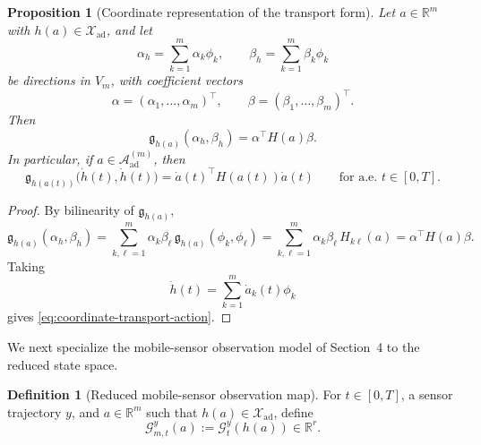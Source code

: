 \documentclass{article}
\newtheorem{proposition}[theorem]{Proposition}
\theoremstyle{definition}
\newtheorem{definition}[theorem]{Definition}
\begin{document}
\begin{proposition}[Coordinate representation of the transport form]
    \label{prop:coordinate-transport-form}
    Let \(a\in\mathbb R^m\) with \(h(a)\in \mathcal X_{\mathrm{ad}}\), and let
    \[
        \alpha_h=\sum_{k=1}^m \alpha_k\phi_k,
        \qquad
        \beta_h=\sum_{k=1}^m \beta_k\phi_k
    \]
    be directions in \(V_m\), with coefficient vectors
    \[
        \alpha=(\alpha_1,\dots,\alpha_m)^\top,
        \qquad
        \beta=(\beta_1,\dots,\beta_m)^\top.
    \]
    Then
    \begin{equation}
        \label{eq:coordinate-transport-form}
        \mathfrak g_{h(a)}(\alpha_h,\beta_h)=\alpha^\top H(a)\beta.
    \end{equation}
    In particular, if \(a\in \mathcal A_{\mathrm{ad}}^{(m)}\), then
    \begin{equation}
        \label{eq:coordinate-transport-action}
        \mathfrak g_{h(a(t))}\bigl(\dot h(t),\dot h(t)\bigr)
        =
        \dot a(t)^\top H(a(t))\dot a(t)
        \qquad\text{for a.e.\ }t\in[0,T].
    \end{equation}
\end{proposition}

\begin{proof}
    By bilinearity of \(\mathfrak g_{h(a)}\),
    \[
        \mathfrak g_{h(a)}(\alpha_h,\beta_h)
        =
        \sum_{k,\ell=1}^m
        \alpha_k\beta_\ell\,\mathfrak g_{h(a)}(\phi_k,\phi_\ell)
        =
        \sum_{k,\ell=1}^m
        \alpha_k\beta_\ell\,H_{k\ell}(a)
        =
        \alpha^\top H(a)\beta.
    \]
    Taking
    \[
        \dot h(t)=\sum_{k=1}^m \dot a_k(t)\phi_k
    \]
    gives \eqref{eq:coordinate-transport-action}.
\end{proof}

We next specialize the mobile-sensor observation model of Section~4 to the reduced state space.

\begin{definition}[Reduced mobile-sensor observation map]
    \label{def:reduced-mobile-observation-map}
    For \(t\in[0,T]\), a sensor trajectory \(y\), and \(a\in\mathbb R^m\) such that
    \(h(a)\in\mathcal X_{\mathrm{ad}}\), define
    \[
        \mathcal G_{m,t}^{y}(a):=\mathcal G_t^y(h(a))\in\mathbb R^r.
    \]
\end{definition}
\end{document}
